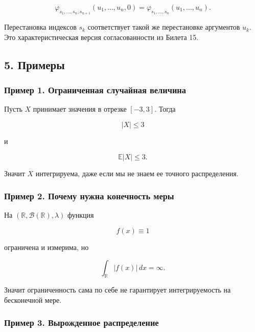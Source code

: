 \documentclass[
  11pt,
  a4paper,
]{article}
\begin{document}
\[
\varphi_{s_1,\ldots,s_n,s_{n+1}}(u_1,\ldots,u_n,0)
=
\varphi_{s_1,\ldots,s_n}(u_1,\ldots,u_n).
\]

Перестановка индексов \(s_k\) соответствует такой же перестановке
аргументов \(u_k\). Это характеристическая версия согласованности из
Билета 15.

\subsection{5. Примеры}\label{ux43fux440ux438ux43cux435ux440ux44b}

\subsubsection{Пример 1. Ограниченная случайная
величина}\label{ux43fux440ux438ux43cux435ux440-1.-ux43eux433ux440ux430ux43dux438ux447ux435ux43dux43dux430ux44f-ux441ux43bux443ux447ux430ux439ux43dux430ux44f-ux432ux435ux43bux438ux447ux438ux43dux430}

Пусть \(X\) принимает значения в отрезке \([-3,3]\). Тогда

\[
|X|\le3
\]

и

\[
\mathbb E|X|\le3.
\]

Значит \(X\) интегрируема, даже если мы не знаем ее точного
распределения.

\subsubsection{Пример 2. Почему нужна конечность
меры}\label{ux43fux440ux438ux43cux435ux440-2.-ux43fux43eux447ux435ux43cux443-ux43dux443ux436ux43dux430-ux43aux43eux43dux435ux447ux43dux43eux441ux442ux44c-ux43cux435ux440ux44b}

На \((\mathbb R,\mathcal B(\mathbb R),\lambda)\) функция

\[
f(x)\equiv1
\]

ограничена и измерима, но

\[
\int_{\mathbb R} |f(x)|\,dx=\infty.
\]

Значит ограниченность сама по себе не гарантирует интегрируемость на
бесконечной мере.

\subsubsection{Пример 3. Вырожденное
распределение}\label{ux43fux440ux438ux43cux435ux440-3.-ux432ux44bux440ux43eux436ux434ux435ux43dux43dux43eux435-ux440ux430ux441ux43fux440ux435ux434ux435ux43bux435ux43dux438ux435}
\end{document}
